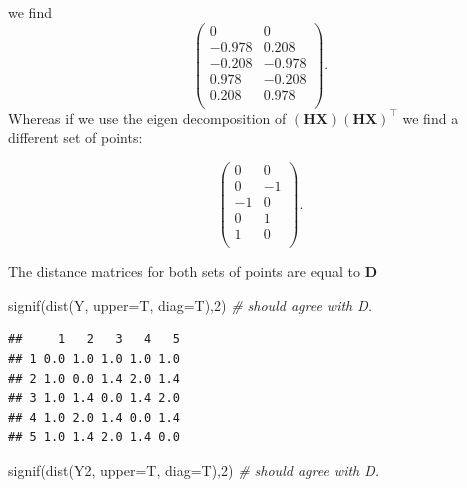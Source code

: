 \documentclass[
]{book}
\newenvironment{Shaded}{\begin{snugshade}}{\end{snugshade}}
\newcommand{\AttributeTok}[1]{\textcolor[rgb]{0.77,0.63,0.00}{#1}}
\newcommand{\CommentTok}[1]{\textcolor[rgb]{0.56,0.35,0.01}{\textit{#1}}}
\newcommand{\DecValTok}[1]{\textcolor[rgb]{0.00,0.00,0.81}{#1}}
\newcommand{\FunctionTok}[1]{\textcolor[rgb]{0.00,0.00,0.00}{#1}}
\newcommand{\NormalTok}[1]{#1}
\newcommand{\OtherTok}[1]{\textcolor[rgb]{0.56,0.35,0.01}{#1}}
\newcommand{\SpecialCharTok}[1]{\textcolor[rgb]{0.00,0.00,0.00}{#1}}
\theoremstyle{definition}
\theoremstyle{definition}
\theoremstyle{definition}
\theoremstyle{definition}
\theoremstyle{remark}
\begin{document}
we find
\[\begin{pmatrix}0&0 \\-0.978&0.208 \\-0.208&-0.978 \\0.978&-0.208 \\0.208&0.978 \\\end{pmatrix}.\]
Whereas if we use the eigen decomposition of \((\mathbf H\mathbf X)(\mathbf H\mathbf X)^\top\) we find a different set of points:

\begin{Shaded}
\end{Shaded}

\[\begin{pmatrix}0&0 \\0&-1 \\-1&0 \\0&1 \\1&0 \\\end{pmatrix}.\]

The distance matrices for both sets of points are equal to \(\mathbf D\)

\begin{Shaded}
\begin{Highlighting}[]
\FunctionTok{signif}\NormalTok{(}\FunctionTok{dist}\NormalTok{(Y, }\AttributeTok{upper=}\NormalTok{T, }\AttributeTok{diag=}\NormalTok{T),}\DecValTok{2}\NormalTok{) }\CommentTok{\# should agree with D.}
\end{Highlighting}
\end{Shaded}

\begin{verbatim}
##     1   2   3   4   5
## 1 0.0 1.0 1.0 1.0 1.0
## 2 1.0 0.0 1.4 2.0 1.4
## 3 1.0 1.4 0.0 1.4 2.0
## 4 1.0 2.0 1.4 0.0 1.4
## 5 1.0 1.4 2.0 1.4 0.0
\end{verbatim}

\begin{Shaded}
\begin{Highlighting}[]
\FunctionTok{signif}\NormalTok{(}\FunctionTok{dist}\NormalTok{(Y2, }\AttributeTok{upper=}\NormalTok{T, }\AttributeTok{diag=}\NormalTok{T),}\DecValTok{2}\NormalTok{) }\CommentTok{\# should agree with D.}
\end{Highlighting}
\end{Shaded}
\end{document}
